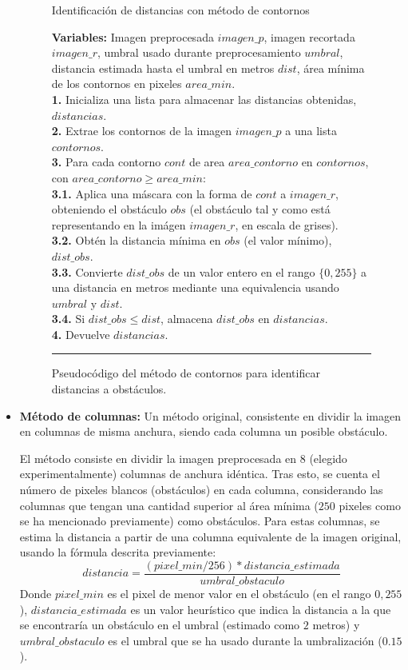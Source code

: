\begin{itemize}
\begin{figure}[h]
\begin{algorithm}[H]
\caption{Identificación de distancias con método de contornos}
\textbf{Variables:} Imagen preprocesada $imagen\_p$, imagen recortada $imagen\_r$, umbral usado durante preprocesamiento $umbral$, distancia estimada hasta el umbral en metros $dist$, área mínima de los contornos en pixeles $area\_min$.\\
\textbf{1.} Inicializa una lista para almacenar las distancias obtenidas, $distancias$.\\
\textbf{2.} Extrae los contornos de la imagen $imagen\_p$ a una lista $contornos$.\\
\textbf{3.} Para cada contorno $cont$ de area $area\_contorno$ en $contornos$, con $area\_contorno \geq area\_min$:\\
\Indp \textbf{3.1.} Aplica una máscara con la forma de $cont$ a $imagen\_r$, obteniendo el obstáculo $obs$ (el obstáculo tal y como está representando en la imágen $imagen\_r$, en escala de grises).\\
\textbf{3.2.} Obtén la distancia mínima en $obs$ (el valor mínimo), $dist\_obs$.\\
\textbf{3.3.} Convierte $dist\_obs$ de un valor entero en el rango $\{0, 255\}$ a una distancia en metros mediante una equivalencia usando $umbral$ y $dist$.\\
\textbf{3.4.} Si $dist\_obs \leq dist$, almacena $dist\_obs$ en $distancias$.\\
\Indm \textbf{4.} Devuelve $distancias$.
\end{algorithm}
\hrule
\caption{Pseudocódigo del método de contornos para identificar distancias a obstáculos.}
\label{alg:contour}
\end{figure}

	\item \textbf{Método de columnas:} Un método original, consistente en dividir la imagen  en columnas de misma anchura, siendo cada columna un posible obstáculo. 
	
	El método consiste en dividir la imagen preprocesada en $8$ (elegido experimentalmente) columnas de anchura idéntica. Tras esto, se cuenta el número de pixeles blancos (obstáculos) en cada columna, considerando las columnas que tengan una cantidad superior al área mínima ($250$ pixeles como se ha mencionado previamente) como obstáculos. Para estas columnas, se estima la distancia a partir de una columna equivalente de la imagen original, usando la fórmula descrita previamente:
	\[distancia = \frac{(pixel\_min / 256) * distancia\_estimada}{umbral\_obstaculo}\]
Donde $pixel\_min$ es el pixel de menor valor en el obstáculo (en el rango ${0, 255}$), $distancia\_estimada$ es un valor heurístico que indica la distancia a la que se encontraría un obstáculo en el umbral (estimado como $2$ metros) y $umbral\_obstaculo$ es el umbral que se ha usado durante la umbralización ($0.15$).


\end{itemize}
